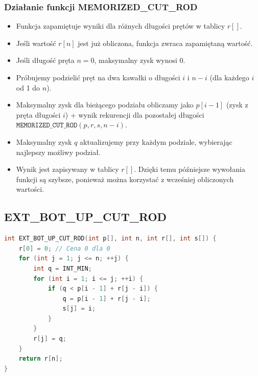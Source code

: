 \documentclass{article}
\begin{document}
			\subsubsection*{Działanie funkcji MEMORIZED\_CUT\_ROD} 
			\begin{itemize} 
				\item Funkcja zapamiętuje wyniki  dla różnych długości prętów w tablicy $r[]$. 
				\item Jeśli wartość $r[n]$ jest już obliczona, funkcja zwraca zapamiętaną wartość.
				\item Jeśli długość pręta $n = 0$, maksymalny zysk wynosi $0$. 
				\item Próbujemy podzielić pręt na dwa kawałki o długości $i$ i $n - i$ (dla każdego $i$ od 1 do $n$). 
				\item Maksymalny zysk dla bieżącego podziału obliczamy jako $p[i - 1]$ (zysk z pręta długości $i$) + wynik rekurencji dla pozostałej długości $\texttt{MEMORIZED\_CUT\_ROD}(p, r, s, n - i)$.
				\item Maksymalny zysk $q$ aktualizujemy przy każdym podziale, wybierając najlepszy możliwy podział. 
				\item Wynik jest zapisywany w tablicy $r[]$. Dzięki temu późniejsze wywołania funkcji są szybsze, ponieważ można korzystać z wcześniej obliczonych wartości. \end{itemize}
			
		\subsection*{EXT\_BOT\_UP\_CUT\_ROD} 
		\begin{lstlisting}[language=C++, tabsize=3, basicstyle=\footnotesize]
int EXT_BOT_UP_CUT_ROD(int p[], int n, int r[], int s[]) {
	r[0] = 0; // Cena 0 dla 0
	for (int j = 1; j <= n; ++j) {
		int q = INT_MIN;
		for (int i = 1; i <= j; ++i) { 
			if (q < p[i - 1] + r[j - i]) {
				q = p[i - 1] + r[j - i];
				s[j] = i; 
			}
		}
		r[j] = q; 
	}
	return r[n];
}
				
		\end{lstlisting}
		
\end{document}
